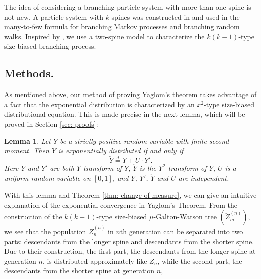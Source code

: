 \documentclass[12pt,a4paper]{amsart}
\newtheorem{lem}[thm]{Lemma}
\numberwithin{equation}{section}
\begin{document}
	The idea of considering a branching particle system with more than one spine is not new.
	A particle system with $k$ spines  was constructed in \cite{harris2015many} and used in the  many-to-few formula for branching Markov processes and branching random walks. 
	Inspired by \cite{harris2015many}, we use a two-spine model to characterize the $k(k-1)$-type size-biased branching process.


\subsection{Methods.} 
	As mentioned above, our method of proving Yaglom's theorem takes advantage of a fact that the exponential distribution is characterized by an $x^2$-type size-biased distributional equation. 
	This is made precise in the next lemma, which will be proved in Section \ref{sec: proofs}:
\begin{lem} \label{lem: our equation}
	Let $Y$ be a strictly positive random variable with finite second moment. 
	Then $Y$ is exponentially distributed if and only if 
\begin{equation} 
\label{eq: x2 type size-biased equation for exponential distribution}
	\ddot Y \overset{d}
	= \dot Y + U \cdot \dot Y'.
\end{equation}
	Here $\dot Y$ and $\dot Y'$ are both $Y$-transform of  $Y$, $\ddot Y$ is the $Y^2$-transform of $Y$, $U$ is a uniform random variable on $[0,1]$, and $\dot Y$, $\dot Y'$, $\ddot Y$ and $U$ are independent.
\end{lem}	
	With this lemma and Theorem \ref{thm: change of measure}, we can give an intuitive explanation of the exponential convergence in Yaglom's Theorem.
	From the construction of the $k(k-1)$-type size-biased $\mu$-Galton-Watson tree $(\ddot Z^{(n)}_m)$, we see that the population $\ddot Z^{(n)}_n$ in $n$th generation can be separated into two parts: descendants from the longer spine and descendants from the shorter spine. 
	Due to their construction, 
	the first part, the descendants from the longer spine at generation $n$, 
	is distributed approximately like $\dot Z_n$, 
	while the second part, the descendants from the shorter spine at generation $n$, 
\end{document}
